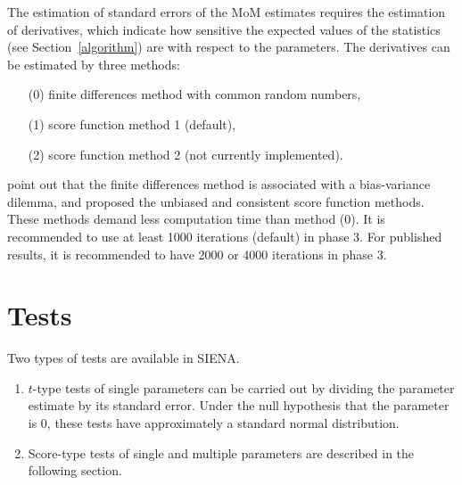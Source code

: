 \documentclass[a4paper,fleqn]{article}
\newcommand{\+}{\, + \,}
\newcommand{\si}{{\sf SIENA}}
\begin{document}
{The estimation of standard errors of the MoM estimates requires the estimation of derivatives,
which indicate how sensitive the expected values of the statistics
(see Section~\ref{algorithm}) are with respect to the parameters.
The derivatives can be estimated by three methods:
\begin{itemize}
\item[(0)] finite differences method with common random numbers,
\item[(1)] score function method 1 (default),
\item[(2)] score function method 2 (not currently implemented).
\end{itemize}
\citet{SchweinbergerSnijders07a} point out that the finite differences method is
associated with a bias-variance dilemma, and proposed the unbiased and
consistent score function methods.  These methods demand less computation time
than method (0).
It
is recommended to use at least 1000 iterations (default) in phase 3.  For
published results, it is recommended to have 2000 or 4000 iterations in phase 3.

\begin{print}
\newpage
\end{print}
\section{Tests}
\label{S_gof}

Two types of tests are available in \si.
\begin{enumerate}
\item $t$-type tests of single parameters can be carried out by
dividing the parameter estimate by its standard error.
Under the null hypothesis that the parameter is 0,
these tests have approximately a standard normal distribution.

\item Score-type tests of single and multiple parameters
      are described in the following section.


\end{enumerate}}
\end{document}
